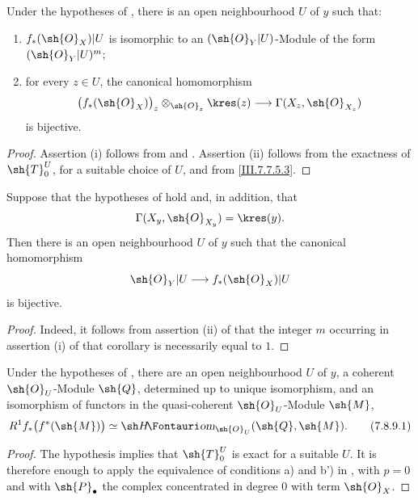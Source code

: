 \begin{corollary}[7.8.7]
\label{III.7.8.7}
Under the hypotheses of , there is an open
neighbourhood $U$ of $y$ such that:
\begin{enumerate}
  \item[(i)] $f_*(\sh{O}_X)|U$ is isomorphic to an
  $(\sh{O}_Y|U)$-Module of the form $(\sh{O}_Y|U)^m$;
  \item[(ii)] for every $z\in U$, the canonical
  homomorphism
  \[
    \bigl(f_*(\sh{O}_X)\bigr)_z
      \otimes_{\sh{O}_z}\kres(z)
    \longrightarrow
    \Gamma(X_z,\sh{O}_{X_z})
  \]
  is bijective.
\end{enumerate}
\end{corollary}

\begin{proof}
Assertion (i) follows from  and
.  Assertion (ii) follows from the
exactness of $\sh{T}_0^U$, for a suitable choice of $U$,
and from \eqref{III.7.7.5.3}.
\end{proof}

\begin{corollary}[7.8.8]
\label{III.7.8.8}
Suppose that the hypotheses of  hold and,
in addition, that
\[
  \Gamma(X_y,\sh{O}_{X_y})=\kres(y).
\]
Then there is an open neighbourhood $U$ of $y$ such that
the canonical homomorphism
\[
  \sh{O}_Y|U\longrightarrow f_*(\sh{O}_X)|U
\]
is bijective.
\end{corollary}

\begin{proof}
Indeed, it follows from assertion (ii) of
 that the integer $m$ occurring in
assertion (i) of that corollary is necessarily equal to
$1$.
\end{proof}

\begin{corollary}[7.8.9]
\label{III.7.8.9}
Under the hypotheses of , there are an open
neighbourhood $U$ of $y$, a coherent $\sh{O}_U$-Module
$\sh{Q}$, determined up to unique isomorphism, and an
isomorphism of functors in the quasi-coherent
$\sh{O}_U$-Module $\sh{M}$,
\[
  R^1f_*\bigl(f^*(\sh{M})\bigr)
  \simeq
  \shHom_{\sh{O}_U}(\sh{Q},\sh{M}).
  \tag{7.8.9.1}\label{III.7.8.9.1}
\]
\end{corollary}

\begin{proof}
The hypothesis implies that $\sh{T}_0^U$ is exact for a
suitable $U$.  It is therefore enough to apply the
equivalence of conditions a) and b') in
, with $p=0$ and with
$\sh{P}_\bullet$ the complex concentrated in degree $0$
with term $\sh{O}_X$.
\end{proof}

